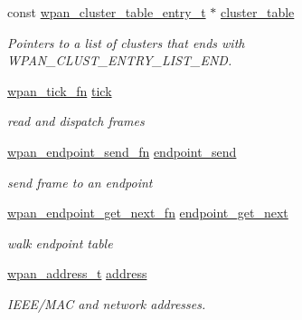 \begin{DoxyCompactItemize}
const \hyperlink{structwpan__cluster__table__entry__t}{wpan\+\_\+cluster\+\_\+table\+\_\+entry\+\_\+t} $\ast$ \hyperlink{group__wpan__aps_gac7944498524739a9becec626bf9bcb15}{cluster\+\_\+table}
\begin{DoxyCompactList}\small\item\em Pointers to a list of clusters that ends with W\+P\+A\+N\+\_\+\+C\+L\+U\+S\+T\+\_\+\+E\+N\+T\+R\+Y\+\_\+\+L\+I\+S\+T\+\_\+\+E\+ND. \end{DoxyCompactList}\item 
\mbox{\label{group__wpan__aps_gab472632c6a95d7856d1ea137441ec6a2}} 
\hyperlink{group__wpan__aps_gafed1542f6becf2d81fd84ef2f0ae2833}{wpan\+\_\+tick\+\_\+fn} \hyperlink{group__wpan__aps_gab472632c6a95d7856d1ea137441ec6a2}{tick}
\begin{DoxyCompactList}\small\item\em read and dispatch frames \end{DoxyCompactList}\item 
\mbox{\label{group__wpan__aps_ga363ce09a97ec0b7a2dbff5b815fc3fbc}} 
\hyperlink{group__wpan__aps_ga505477d0257efe527747c6d1f561cd6c}{wpan\+\_\+endpoint\+\_\+send\+\_\+fn} \hyperlink{group__wpan__aps_ga363ce09a97ec0b7a2dbff5b815fc3fbc}{endpoint\+\_\+send}
\begin{DoxyCompactList}\small\item\em send frame to an endpoint \end{DoxyCompactList}\item 
\mbox{\label{group__wpan__aps_ga249b57f4a0559c0adb038f68d9b5c443}} 
\hyperlink{group__wpan__aps_ga4239e4654962f88f42a53abae18e7827}{wpan\+\_\+endpoint\+\_\+get\+\_\+next\+\_\+fn} \hyperlink{group__wpan__aps_ga249b57f4a0559c0adb038f68d9b5c443}{endpoint\+\_\+get\+\_\+next}
\begin{DoxyCompactList}\small\item\em walk endpoint table \end{DoxyCompactList}\item 
\mbox{\label{group__wpan__aps_ga66a58a737aee9733019399e2eceabf4a}} 
\hyperlink{structwpan__address__t}{wpan\+\_\+address\+\_\+t} \hyperlink{group__wpan__aps_ga66a58a737aee9733019399e2eceabf4a}{address}
\begin{DoxyCompactList}\small\item\em I\+E\+E\+E/\+M\+AC and network addresses. \end{DoxyCompactList}\item 

\end{DoxyCompactItemize}
